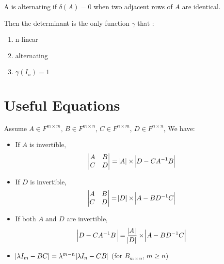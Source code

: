 \begin{definition}[alternating]
    A  is alternating if $\delta (A) = 0$ when two adjacent rows of $A$ are identical.
\end{definition}

Then the determinant is the only function $\gamma$ that :
\begin{enumerate}
    \item n-linear
    \item alternating
    \item $\gamma(I_n) = 1$
\end{enumerate}


\section{Useful Equations}
\begin{theorem}
    Assume $A \in F^{m \times m}$, $B \in F^{m \times n}$, $C \in F^{n \times m}$, $D \in F^{n \times n}$, We have:
    \begin{itemize}
        \item If $A$ is invertible, \begin{equation}
            \begin{vmatrix}
                A & B \\
                C & D
                \end{vmatrix} = \abs{A} \times \abs{D - C {A}^{-1} B}
        \end{equation}
    \item If $D$ is invertible, \begin{equation}
            \begin{vmatrix}
                A & B \\
                C & D
                \end{vmatrix} = \abs{D} \times \abs{A - B {D}^{-1} C}
        \end{equation}
    \item If both $A$ and $D$ are invertible, \begin{equation}
        \abs{D - C {A}^{-1} B} = \frac{\abs{A}}{\abs{D}} \times \abs{A - B {D}^{-1} C}
        \end{equation}
    \item $\abs{\lambda I_m - BC} =\lambda^{m-n} \abs{\lambda I_n - CB}$ (for $B_{m \times n}$, $m \geq n$)
    \end{itemize}
\end{theorem}


